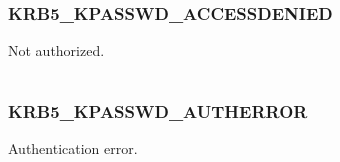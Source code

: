 \documentclass[letterpaper,10pt,english]{sphinxmanual}
\begin{document}
\begin{tabulary}{\linewidth}{|L|L|}
\hline

 & 
\\\hline
\end{tabulary}



\subsubsection{KRB5\_KPASSWD\_ACCESSDENIED}
\label{appdev/refs/macros/KRB5_KPASSWD_ACCESSDENIED:krb5-kpasswd-accessdenied}\label{appdev/refs/macros/KRB5_KPASSWD_ACCESSDENIED:krb5-kpasswd-accessdenied-data}\label{appdev/refs/macros/KRB5_KPASSWD_ACCESSDENIED::doc}

\begin{fulllineitems}
\label{appdev/refs/macros/KRB5_KPASSWD_ACCESSDENIED:KRB5_KPASSWD_ACCESSDENIED}
\end{fulllineitems}


Not authorized.

\begin{tabulary}{\linewidth}{|L|L|}
\hline

 & 
\\\hline
\end{tabulary}



\subsubsection{KRB5\_KPASSWD\_AUTHERROR}
\label{appdev/refs/macros/KRB5_KPASSWD_AUTHERROR:krb5-kpasswd-autherror-data}\label{appdev/refs/macros/KRB5_KPASSWD_AUTHERROR:krb5-kpasswd-autherror}\label{appdev/refs/macros/KRB5_KPASSWD_AUTHERROR::doc}

\begin{fulllineitems}
\label{appdev/refs/macros/KRB5_KPASSWD_AUTHERROR:KRB5_KPASSWD_AUTHERROR}
\end{fulllineitems}


Authentication error.

\begin{tabulary}{\linewidth}{|L|L|}
\hline

 & 
\\\hline
\end{tabulary}
\end{document}
